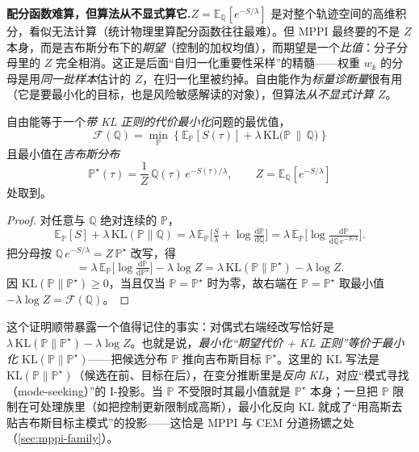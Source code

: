 \begin{note}
\textbf{配分函数难算，但算法从不显式算它.}\;$Z=\mathbb{E}_{\mathbb{Q}}[e^{-S/\lambda}]$ 是对整个轨迹空间的高维积分，看似无法计算（统计物理里算配分函数往往最难）。但 MPPI 最终要的不是 $Z$ 本身，而是吉布斯分布下的\emph{期望}（控制的加权均值），而期望是一个\emph{比值}：分子分母里的 $Z$ 完全相消。这正是后面“自归一化重要性采样”的精髓——权重 $w_k$ 的分母是用\emph{同一批样本}估计的 $Z$，在归一化里被约掉。自由能作为\emph{标量诊断量}很有用（它是要最小化的目标，也是风险敏感解读的对象），但算法\emph{从不显式计算 $Z$}。
\end{note}

\begin{theorem}\label{thm:mppi-duality}
自由能等于一个\emph{带 KL 正则的代价最小化}问题的最优值，
\begin{equation}
  \boxed{\ \mathcal{F}(\mathbb{Q})=\min_{\mathbb{P}}\ \Big\{\ \mathbb{E}_{\mathbb{P}}[S(\tau)]+\lambda\,\mathrm{KL}\big(\mathbb{P}\,\|\,\mathbb{Q}\big)\ \Big\}\ }
  \label{eq:mppi-dual}
\end{equation}
且最小值在\emph{吉布斯分布}
\begin{equation}
  \mathbb{P}^\star(\tau)=\frac{1}{Z}\,\mathbb{Q}(\tau)\,e^{-S(\tau)/\lambda},\qquad Z=\mathbb{E}_{\mathbb{Q}}[e^{-S/\lambda}]
  \label{eq:mppi-gibbs}
\end{equation}
处取到。
\end{theorem}
\begin{proof}
对任意与 $\mathbb{Q}$ 绝对连续的 $\mathbb{P}$，
\[
  \mathbb{E}_{\mathbb{P}}[S]+\lambda\,\mathrm{KL}(\mathbb{P}\|\mathbb{Q})
  =\lambda\,\mathbb{E}_{\mathbb{P}}\!\Big[\tfrac{S}{\lambda}+\log\tfrac{\mathrm{d}\mathbb{P}}{\mathrm{d}\mathbb{Q}}\Big]
  =\lambda\,\mathbb{E}_{\mathbb{P}}\!\Big[\log\tfrac{\mathrm{d}\mathbb{P}}{\mathrm{d}\mathbb{Q}\,e^{-S/\lambda}}\Big].
\]
把分母按 $\mathbb{Q}\,e^{-S/\lambda}=Z\,\mathbb{P}^\star$ 改写，得
\[
  =\lambda\,\mathbb{E}_{\mathbb{P}}\!\Big[\log\tfrac{\mathrm{d}\mathbb{P}}{\mathrm{d}\mathbb{P}^\star}\Big]-\lambda\log Z
  =\lambda\,\mathrm{KL}(\mathbb{P}\|\mathbb{P}^\star)-\lambda\log Z.
\]
因 $\mathrm{KL}(\mathbb{P}\|\mathbb{P}^\star)\ge0$，当且仅当 $\mathbb{P}=\mathbb{P}^\star$ 时为零，故右端在 $\mathbb{P}=\mathbb{P}^\star$ 取最小值 $-\lambda\log Z=\mathcal{F}(\mathbb{Q})$。
\end{proof}

\noindent 这个证明顺带暴露一个值得记住的事实：对偶式右端经改写恰好是 $\lambda\,\mathrm{KL}(\mathbb{P}\|\mathbb{P}^\star)-\lambda\log Z$。也就是说，\emph{最小化“期望代价 + KL 正则”等价于最小化 $\mathrm{KL}(\mathbb{P}\|\mathbb{P}^\star)$}——把候选分布 $\mathbb{P}$ 推向吉布斯目标 $\mathbb{P}^\star$。这里的 KL 写法是 $\mathrm{KL}(\mathbb{P}\|\mathbb{P}^\star)$（候选在前、目标在后），在变分推断里是\emph{反向 KL}，对应“模式寻找（mode-seeking）”的 I-投影。当 $\mathbb{P}$ 不受限时其最小值就是 $\mathbb{P}^\star$ 本身；一旦把 $\mathbb{P}$ 限制在可处理族里（如把控制更新限制成高斯），最小化反向 KL 就成了“用高斯去贴吉布斯目标主模式”的投影——这恰是 MPPI 与 CEM 分道扬镳之处（\cref{sec:mppi-family}）。

